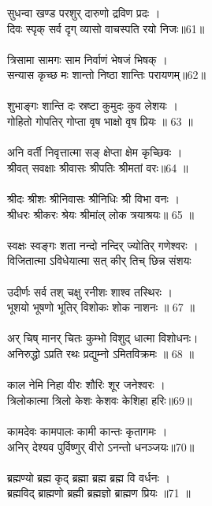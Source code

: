 \subsubsection{}
सुधन्वा खण्ड परशुर् दारुणो द्रविण प्रदः ।\\
दिवः स्पृक् सर्व दृग् व्यासो वाचस्पति रयो निजः॥61॥\\
\\
त्रिसामा सामगः साम निर्वाणं भेषजं भिषक् ।\\
सन्यास कृच्छ मः शान्तो निष्ठा शान्तिः परायणम्॥62॥\\
\\
शुभाङ्गः शान्ति दः स्रष्टा कुमुदः कुव लेशयः ।\\
गोहितो गोपतिर् गोप्ता वृष भाक्षो वृष प्रियः ॥ 63 ॥\\
\\
अनि वर्ती निवृत्तात्मा सङ् क्षेप्ता क्षेम कृच्छिवः ।\\
श्रीवत् सवक्षाः श्रीवासः श्रीपतिः श्रीमतां वरः॥64 ॥\\
\\
श्रीदः श्रीशः श्रीनिवासः श्रीनिधिः श्री विभा वनः ।\\
श्रीधरः श्रीकरः श्रेयः श्रीमांल् लोक त्रयाश्रयः॥ 65 ॥\\
\\
स्वक्षः स्वङ्गः शता नन्दो नन्दिर् ज्योतिर् गणेश्वरः ।\\
विजितात्मा ऽविधेयात्मा सत् कीर् तिच् छिन्न संशयः\\
\\
उदीर्णः सर्व तश् चक्षु रनीशः शाश्व तस्थिरः ।\\
भूशयो भूषणो भूतिर् विशोकः शोक नाशनः ॥ 67 ॥\\
\\
अर् चिष् मानर् चितः कुम्भो विशुद् धात्मा विशोधनः।\\
अनिरुद्धो ऽप्रति रथः प्रद्युम्नो ऽमितविक्रमः ॥ 68 ॥\\
\\
काल नेमि निहा वीरः शौरिः शूर जनेश्वरः ।\\
त्रिलोकात्मा त्रिलो केशः केशवः केशिहा हरिः॥69॥\\
\\
कामदेवः कामपालः कामी कान्तः कृतागमः ।\\
अनिर् देश्यव पुर्विष्णुर् वीरो ऽनन्तो धनञ्जयः॥70॥\\
\\
ब्रह्मण्यो ब्रह्म कृद् ब्रह्मा ब्रह्म ब्रह्म वि वर्धनः ।\\
ब्रह्मविद् ब्राह्मणो ब्रह्मी ब्रह्मज्ञो ब्राह्मण प्रियः ॥71 ॥\\
